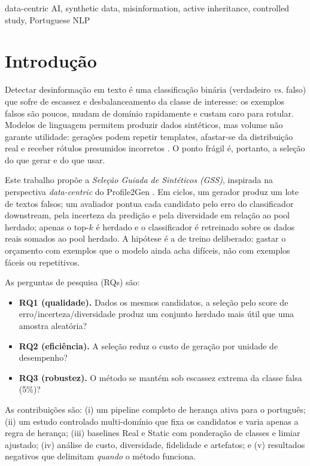 \documentclass[conference]{IEEEtran}
\begin{document}
\begin{IEEEkeywords}
data-centric AI, synthetic data, misinformation, active inheritance, controlled study, Portuguese NLP
\end{IEEEkeywords}

\section{Introdu\c{c}\~ao}

Detectar desinforma\c{c}\~ao em texto \'e uma classifica\c{c}\~ao bin\'aria (verdadeiro \emph{vs.} falso) que sofre de escassez e desbalanceamento da classe de interesse: os exemplos falsos s\~ao poucos, mudam de dom\'inio rapidamente e custam caro para rotular. Modelos de linguagem permitem produzir dados sint\'eticos, mas volume n\~ao garante utilidade: gera\c{c}\~oes podem repetir templates, afastar-se da distribui\c{c}\~ao real e receber r\'otulos presumidos incorretos \cite{shumailov2024collapse}. O ponto fr\'agil \'e, portanto, a sele\c{c}\~ao do que gerar e do que usar.

Este trabalho prop\~oe a \emph{Sele\c{c}\~ao Guiada de Sint\'eticos (GSS)}, inspirada na perspectiva \emph{data-centric} do Profile2Gen \cite{souza2025profile2gen}. Em ciclos, um gerador produz um lote de textos falsos; um avaliador pontua cada candidato pelo erro do classificador downstream, pela incerteza da predi\c{c}\~ao e pela diversidade em rela\c{c}\~ao ao pool herdado; apenas o top-$k$ \'e herdado e o classificador \'e retreinado sobre os dados reais somados ao pool herdado. A hip\'otese \'e a de treino deliberado: gastar o or\c{c}amento com exemplos que o modelo ainda acha dif\'iceis, n\~ao com exemplos f\'aceis ou repetitivos.

As perguntas de pesquisa (RQs) s\~ao:

\begin{itemize}
\item \textbf{RQ1 (qualidade).} Dados os mesmos candidatos, a sele\c{c}\~ao pelo score de erro/incerteza/diversidade produz um conjunto herdado mais \'util que uma amostra aleat\'oria?
\item \textbf{RQ2 (efici\^encia).} A sele\c{c}\~ao reduz o custo de gera\c{c}\~ao por unidade de desempenho?
\item \textbf{RQ3 (robustez).} O m\'etodo se mant\'em sob escassez extrema da classe falsa (5\%)?
\end{itemize}

As contribui\c{c}\~oes s\~ao: (i) um pipeline completo de heran\c{c}a ativa para o portugu\^es; (ii) um estudo controlado multi-dom\'inio que fixa os candidatos e varia apenas a regra de heran\c{c}a; (iii) baselines Real e Static com pondera\c{c}\~ao de classes e limiar ajustado; (iv) an\'alise de custo, diversidade, fidelidade e artefatos; e (v) resultados negativos que delimitam \emph{quando} o m\'etodo funciona.
\end{document}
